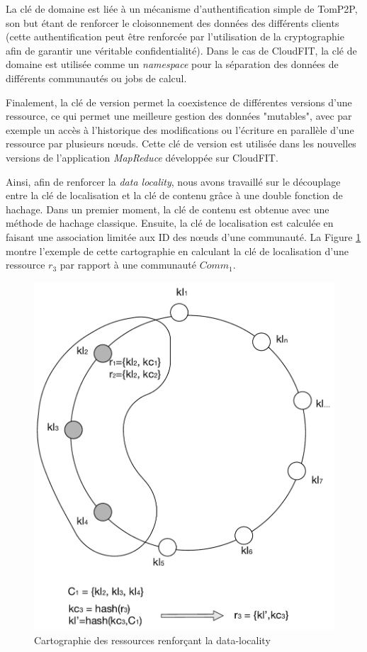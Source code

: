 La clé de domaine est liée à un mécanisme d'authentification simple de TomP2P, son but étant de renforcer le cloisonnement des données des différents clients (cette authentification peut être renforcée par l'utilisation de la cryptographie afin de garantir une véritable confidentialité). Dans le cas de CloudFIT, la clé de domaine est utilisée comme un \textit{namespace} pour la séparation des données de différents communautés ou jobs de calcul. 

Finalement, la clé de version permet la coexistence de différentes versions d'une ressource, ce qui permet une meilleure gestion des données "mutables", avec par exemple un accès à l'historique des modifications ou l'écriture en parallèle d'une ressource par plusieurs n{\oe}uds. Cette clé de version est utilisée dans les nouvelles versions de l'application \textit{MapReduce} développée sur CloudFIT.

Ainsi, afin de renforcer la \textit{data locality}, nous avons travaillé sur le découplage entre la clé de localisation et la clé de contenu grâce à une double fonction de hachage. Dans un premier moment, la clé de contenu est obtenue avec une méthode de hachage classique. Ensuite, la clé de localisation est calculée en faisant une association limitée aux ID des n{\oe}uds d'une communauté. La Figure \ref{fig:hash} montre l'exemple de cette cartographie en calculant la clé de localisation d'une ressource $r_3$ par rapport à une communauté $Comm_1$.

\begin{figure}[!ht]
	\centering
	\includegraphics[width=0.5\linewidth]{img/hashing.pdf}
	\caption{Cartographie des ressources renforçant la data-locality}
	\label{fig:hash}
\end{figure}


